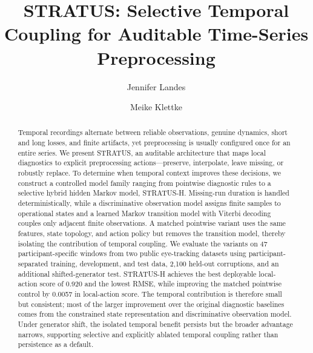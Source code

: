 \documentclass[sigconf,review]{acmart}
\newcommand{\STRATUS}{\textsc{STRATUS}\xspace}
\begin{document}
\title[STRATUS]{STRATUS: Selective Temporal Coupling for Auditable Time-Series Preprocessing}

\author{Jennifer Landes}

\author{Meike Klettke}


\renewcommand{\shortauthors}{Landes and Klettke}

\begin{abstract}
Temporal recordings alternate between reliable observations, genuine dynamics, short and long losses, and finite artifacts, yet preprocessing is usually configured once for an entire series. We present \STRATUS, an auditable architecture that maps local diagnostics to explicit preprocessing actions---preserve, interpolate, leave missing, or robustly replace. To determine when temporal context improves these decisions, we construct a controlled model family ranging from pointwise diagnostic rules to a selective hybrid hidden Markov model, \mbox{STRATUS-H}. Missing-run duration is handled deterministically, while a discriminative observation model assigns finite samples to operational states and a learned Markov transition model with Viterbi decoding couples only adjacent finite observations. A matched pointwise variant uses the same features, state topology, and action policy but removes the transition model, thereby isolating the contribution of temporal coupling. We evaluate the variants on 47 participant-specific windows from two public eye-tracking datasets using participant-separated training, development, and test data, 2,100 held-out corruptions, and an additional shifted-generator test. \mbox{STRATUS-H} achieves the best deployable local-action score of 0.920 and the lowest RMSE, while improving the matched pointwise control by 0.0057 in local-action score. The temporal contribution is therefore small but consistent; most of the larger improvement over the original diagnostic baselines comes from the constrained state representation and discriminative observation model. Under generator shift, the isolated temporal benefit persists but the broader advantage narrows, supporting selective and explicitly ablated temporal coupling rather than persistence as a default.
\end{abstract}
\end{document}
